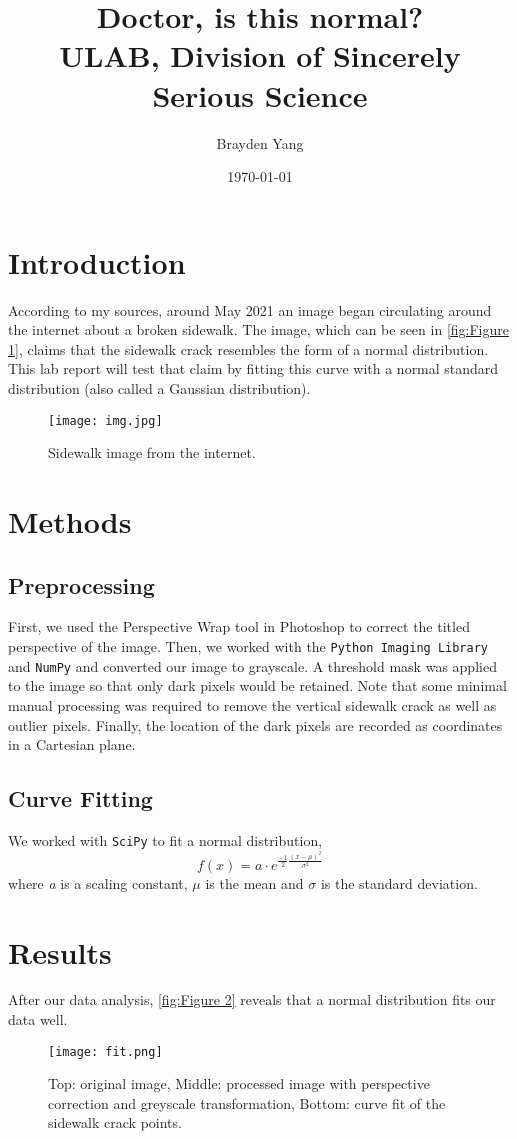 \documentclass{article}
\title{Doctor, is this normal? 
\\ \large{ULAB, Division of Sincerely Serious Science}}
\author{Brayden Yang}
\date\today
\begin{document}
\maketitle

\section{Introduction}
According to my sources, around May 2021 an image began circulating around the internet about a broken
sidewalk. The image, which can be seen in \autoref{fig:Figure 1}, claims that the sidewalk crack resembles the form
of a normal distribution. This lab report will test that claim by fitting this curve with a normal standard
distribution (also called a Gaussian distribution). 
\begin{figure}[h]
    \centering
    \texttt{[image: img.jpg]}
    \caption{Sidewalk image from the internet.}
    \label{fig:Figure 1}
\end{figure}

\section{Methods}
\subsection{Preprocessing}
First, we used the Perspective Wrap tool in Photoshop to correct the titled perspective of the image. Then,
we worked with the \texttt{Python Imaging Library} and \texttt{NumPy} \cite{2020NumPy-Array} and converted our image to grayscale.
A threshold mask was applied to the image so that only dark pixels would be retained. Note that some
minimal manual processing was required to remove the vertical sidewalk crack as well as outlier pixels.
Finally, the location of the dark pixels are recorded as coordinates in a Cartesian plane.

\subsection{Curve Fitting}
We worked with \texttt{SciPy} \cite{2020SciPy-NMeth} to fit a normal distribution,
\begin{equation}
    f(x) = a \cdot e^{\frac{-1}{2}\frac{(x-\mu)^2}{\sigma^2}}
\end{equation}
where \textit{a} is a scaling constant, $\mu$ is the mean and $\sigma$ is the standard deviation.

\section{Results}
After our data analysis, \autoref{fig:Figure 2} reveals that a normal distribution fits our data well.
\begin{figure}[h]
    \centering
    \texttt{[image: fit.png]}
    \caption{Top: original image, Middle: processed image with perspective correction and greyscale transformation, Bottom: curve fit of the sidewalk crack points.}
    \label{fig:Figure 2}
\end{figure}
\end{document}
